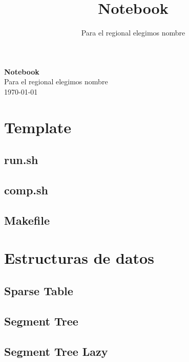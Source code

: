\documentclass[a4paper,11pt,landscape,twocolumn]{article}
\title{Notebook}
\author{Para el regional elegimos nombre}
\begin{document}
\begin{center}
    \LARGE\textbf{Notebook}\\[1em]
    \large Para el regional elegimos nombre\\[1em]
    \normalsize \today\\[1em]
\end{center}

\tableofcontents

\section{Template}



\subsection{run.sh}



\subsection{comp.sh}



\subsection{Makefile}



\section{Estructuras de datos}

\subsection{Sparse Table}



\subsection{Segment Tree}



\subsection{Segment Tree Lazy}
\end{document}
